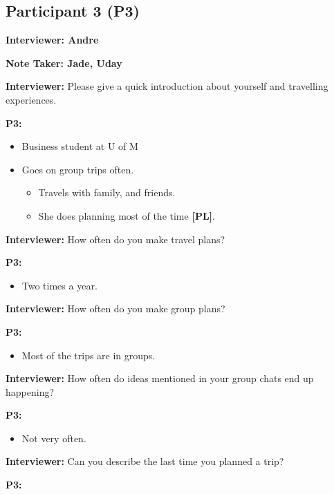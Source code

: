 \documentclass[12pt,a4paper]{article}
\begin{document}
\subsection{Participant 3 (P3)}

\textbf{Interviewer: Andre}

\textbf{Note Taker: Jade, Uday}


\textbf{Interviewer: }Please give a quick introduction about yourself and travelling experiences.

\textbf{P3: }

\begin{itemize}
    \item Business student at U of M
    \item Goes on group trips often.
    \begin{itemize} 
        \item Travels with family, and friends. 
        \item She does planning most of the time \textbf{[PL]}.
    \end{itemize}
\end{itemize}

\textbf{Interviewer:} How often do you make travel plans?

\textbf{P3: }

\begin{itemize}
    \item Two times a year. 
\end{itemize}

\textbf{Interviewer: }How often do you make group plans?

\textbf{P3: }

\begin{itemize}
    \item Most of the trips are in groups. 
\end{itemize}

\textbf{Interviewer: }How often do ideas mentioned in your group chats end up happening?

\textbf{P3: }

\begin{itemize}
    \item Not very often. 
\end{itemize}

\textbf{Interviewer: }Can you describe the last time you planned a trip?

\textbf{P3: }
\end{document}
